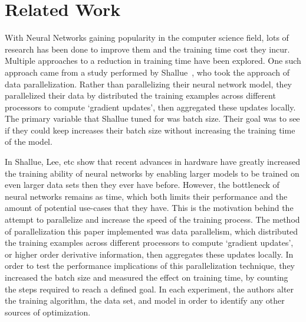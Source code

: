 \documentclass[11pt,twocolumn]{article}
\begin{document}
\section {Related Work}\label{relwork}

With Neural Networks gaining popularity in the computer science field, lots of research has been done to improve them and the training time cost they incur. Multiple approaches to a reduction in training time have been explored. One such approach came from a study performed by  Shallue~\cite{Shallue:NNTraining}, who took the approach of data parallelization. Rather than parallelizing their neural network model, they parallelized their data by distributed the training examples across different processors to compute ‘gradient updates’, then aggregated these updates locally. The primary variable that Shallue tuned for was batch size. Their goal was to see if they could keep increases their batch size without increasing the training time of the model.

In Shallue, Lee, etc \cite{Shallue:NNTraining} show that recent advances in hardware have greatly increased the training ability of neural networks by enabling larger models to be trained on even larger data sets then they ever have before. However, the bottleneck of neural networks remains as time, which both limits their performance and the amount of potential use-cases that they have. This is the motivation behind the attempt to parallelize and increase the speed of the training process. The method of parallelization this paper implemented was data parallelism, which distributed the training examples across different processors to compute `gradient updates’, or higher order derivative information, then aggregates these updates locally. In order to test the performance implications of this parallelization technique, they increased the batch size and measured the effect on training time, by counting the steps required to reach a defined goal. In each experiment, the authors alter the training algorithm, the data set, and model in order to identify any other sources of optimization.
\end{document}
